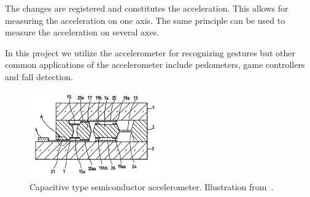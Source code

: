 The changes are registered and constitutes the acceleration. This allows for measuring the acceleration on one axis. The same principle can be used to measure the acceleration on several axes.

In this project we utilize the accelerometer for recognizing gestures but other common applications of the accelerometer include pedometers, game controllers and fall detection.

\begin{figure}
\centering
\includegraphics[width=0.5\textwidth]{images/accelerometer}
\caption{Capacitive type semiconductor accelerometer. Illustration from~\cite{kloeck1993capacitive}.}
\label{fig:accelerometer}
\end{figure}


